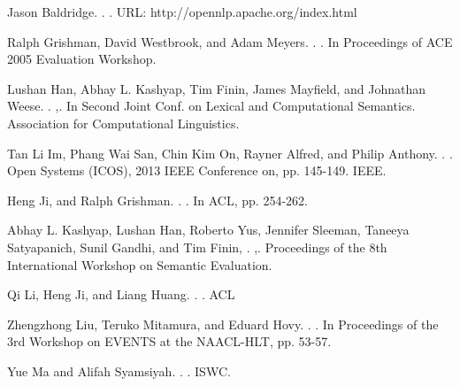 \documentclass[11pt]{article}
\begin{document}
\begin{thebibliography}{}

{Jason Baldridge}.
.
.
\newblock URL: http://opennlp.apache.org/index.html

{Ralph Grishman, David Westbrook, and Adam Meyers}. 
.
.
\newblock In Proceedings of ACE 2005 Evaluation Workshop.

{Lushan Han, Abhay L. Kashyap, Tim Finin, James Mayfield, and Johnathan Weese.}
.
,.
\newblock In Second Joint Conf. on Lexical and Computational Semantics. Association for Computational Linguistics.

{Tan Li Im, Phang Wai San, Chin Kim On, Rayner Alfred, and Philip Anthony}. 
.
. 
\newblock Open Systems (ICOS), 2013 IEEE Conference on, pp. 145-149. IEEE.

{Heng Ji, and Ralph Grishman}.
.
. 
\newblock In ACL, pp. 254-262.


{Abhay L. Kashyap, Lushan Han, Roberto Yus, Jennifer Sleeman, Taneeya Satyapanich, Sunil Gandhi, and Tim Finin},
.
,.
\newblock Proceedings of the 8th International Workshop on Semantic Evaluation.

{Qi Li, Heng Ji, and Liang Huang}.
.
.
\newblock ACL

{Zhengzhong Liu, Teruko Mitamura, and Eduard Hovy}.
.
.
\newblock In Proceedings of the 3rd Workshop on EVENTS at the NAACL-HLT, pp. 53-57.

{Yue Ma and Alifah Syamsiyah}.
.
.
\newblock ISWC.


\end{thebibliography}
\end{document}
